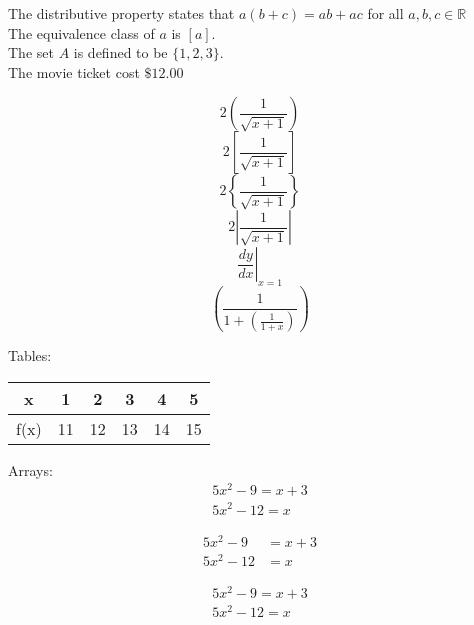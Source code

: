 \documentclass[18px]{article}
\begin{document}
The distributive property states that $a(b+c)=ab+ac$ for all $a,b,c \in \mathbb{R}$\\[6pt]
The equivalence class of $a$ is $[a]$.\\[6pt]
The set $A$ is defined to be $\{1,2,3\}$.\\[6pt]
The movie ticket cost $\$12.00$

$$2\left(\frac{1}{\sqrt{x + 1}}\right)$$
$$2\left[\frac{1}{\sqrt{x + 1}}\right]$$
$$2\left\{\frac{1}{\sqrt{x + 1}}\right\}$$
$$2\left|\frac{1}{\sqrt{x + 1}}\right|$$
$$\left.\frac{dy}{dx}\right|_{x=1}$$
$$\left(\frac{1}{1 + \left(\frac{1}{1+x}\right)} \right)$$

Tables:\\

\begin{tabular}{|c||c|c|c|c|c|}
\hline
x & 1 & 2 & 3 & 4 & 5 \\ \hline
f(x) & 11 & 12 & 13 & 14 & 15 \\ \hline 

\end{tabular}

Arrays:
\begin{align}
5x^2-9=x+3\\
5x^2-12=x
\end{align}

\begin{align*}
5x^2-9 &=x+3\\
5x^2-12 &=x
\end{align*}

\begin{align}
5x^2-9=x+3\\
5x^2-12=x
\end{align}
\end{document}
